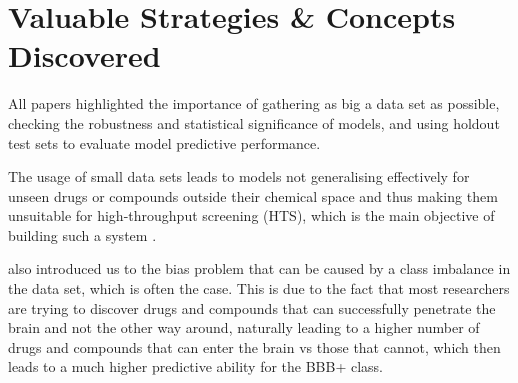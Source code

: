 \section{Valuable Strategies \& Concepts Discovered}

All papers highlighted the importance of gathering as big a data set as possible, checking the robustness and statistical significance of models, and using holdout test sets to evaluate model predictive performance. 

The usage of small data sets leads to models not generalising effectively for unseen drugs or compounds outside their chemical space and thus making them unsuitable for high-throughput screening (HTS), which is the main objective of building such a system \citep{Singh2020}.

\citet{Zhang2008} also introduced us to the bias problem that can be caused by a class imbalance in the data set, which is often the case. This is due to the fact that most researchers are trying to discover drugs and compounds that can successfully penetrate the brain and not the other way around, naturally leading to a higher number of drugs and compounds that can enter the brain vs those that cannot, which then leads to a much higher predictive ability for the BBB+ class.



